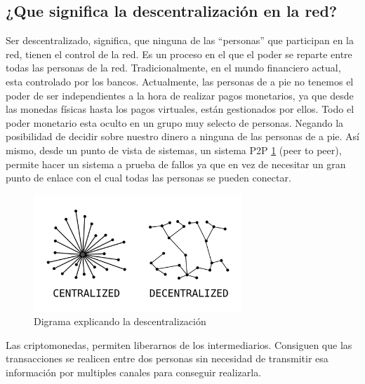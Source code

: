 \subsection*{¿Que significa la descentralización en la red?}
Ser descentralizado, significa, que ninguna de las “personas” que participan en la red, tienen el control de la red. Es un proceso en el que el poder se reparte entre todas las personas de la red. Tradicionalmente, en el mundo financiero actual, esta controlado por los bancos. Actualmente, las personas de a pie no tenemos el poder de ser independientes a la hora de realizar pagos monetarios, ya que desde las monedas físicas hasta los pagos virtuales, están gestionados por ellos. Todo el poder monetario esta oculto en un grupo muy selecto de personas. Negando la posibilidad de decidir sobre nuestro dinero a ninguna de las personas de a pie.
Así mismo, desde un punto de vista de sistemas, un sistema P2P \ref{fg:decentralization_diagram} (peer to peer), permite hacer un sistema a prueba de fallos ya que en vez de necesitar un gran punto de enlace con el cual todas las personas se pueden conectar.
\begin{figure}[h!]
    \centering
    \includegraphics[width=0.7\textwidth]{Figures/Decentralization_diagram.png}
    \caption{Digrama explicando la descentralización}
    \label{fg:decentralization_diagram}
\end{figure}
Las criptomonedas, permiten liberarnos de los intermediarios. Consiguen que las transacciones se realicen entre dos personas sin necesidad de transmitir esa información por multiples canales para conseguir realizarla.
